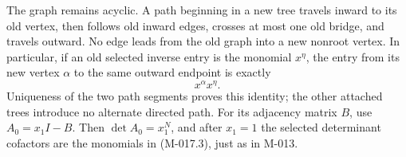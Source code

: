 The graph remains acyclic. A path beginning in a new tree
travels inward to its old vertex, then follows old inward
edges, crosses at most one old bridge, and travels outward.
No edge leads from the old graph into a new nonroot vertex.
In particular, if an old selected inverse entry is the
monomial \(x^\eta\), the entry from its new vertex
\(\alpha\) to the same outward endpoint is exactly
\[
                              x^\alpha x^\eta.
                                                               \tag{M-017.3}
\]
Uniqueness of the two path segments proves this identity;
the other attached trees introduce no alternate directed path.
For its adjacency matrix \(B\), use \(A_0=x_1I-B\).
Then \(\det A_0=x_1^N\), and after \(x_1=1\)
the selected determinant cofactors are the monomials in
(M-017.3), just as in M-013.

